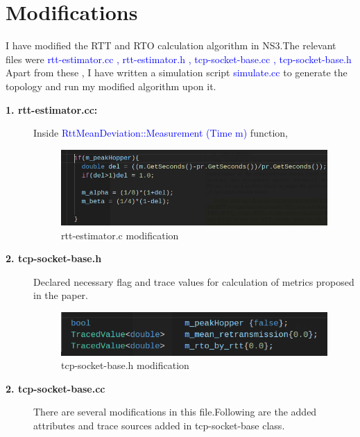 \documentclass{article}[12pt]
\begin{document}
\section{Modifications}
\label{sec:mod}
    I have modified the RTT and RTO calculation algorithm in NS3.The relevant files were \textcolor{blue}{rtt-estimator.cc , rtt-estimator.h , tcp-socket-base.cc , tcp-socket-base.h }
    Apart from these , I have written a simulation script \textcolor{blue}{simulate.cc} to generate the topology and run my modified algorithm upon it.
    \begin{description}
        \item[\textbf{1. rtt-estimator.cc:}]
        
        Inside \textcolor{blue}{RttMeanDeviation::Measurement (Time m)} function,\\
		\begin{figure}[H]
			\centering
			\includegraphics[width=.9\textwidth]{Pictures/algo/rtt_estimator2.png}
			\caption{rtt-estimator.c modification}
		\end{figure}   

    \item[\textbf{2. tcp-socket-base.h}]
    Declared necessary flag and trace values for calculation of metrics proposed in the paper.\\
    	\begin{figure}[H]
    	\centering
    	\includegraphics[width=.9\textwidth]{Pictures/algo/tcp-socket-base.h.png}
    	\caption{tcp-socket-base.h modification}
        \end{figure}   
    
    
    \item[\textbf{2. tcp-socket-base.cc}] 
    There are several modifications in this file.Following are the added attributes and trace sources added in tcp-socket-base class.\\
    

\end{description}
\end{document}

